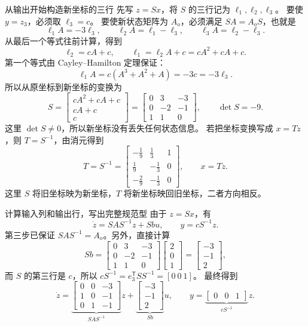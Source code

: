 \documentclass[11pt]{article}
\begin{document}
\begin{solution}
\begin{proofstep}{从输出开始构造新坐标的三行}
先写 $z=Sx$，将 $S$ 的三行记为 $\ell_1,\ell_2,\ell_3$。
要使 $y=z_3$，必须取 $\ell_3=c$。
要使新状态矩阵为 $A_o$，必须满足 $SA=A_oS$，也就是
\[
\ell_1A=-3\ell_3,\qquad
\ell_2A=\ell_1-\ell_3,\qquad
\ell_3A=\ell_2-\ell_3.
\]
从最后一个等式往前计算，得到
\[
\ell_2=cA+c,\qquad
\ell_1=\ell_2A+c=cA^2+cA+c.
\]
第一个等式由 Cayley--Hamilton 定理保证：
\[
\ell_1A=c(A^3+A^2+A)=-3c=-3\ell_3.
\]
所以从原坐标到新坐标的变换为
\[
S=\begin{bmatrix}cA^2+cA+c\\cA+c\\c\end{bmatrix}
=\begin{bmatrix}0&3&-3\\0&-2&-1\\1&1&0\end{bmatrix},\qquad \det S=-9.
\]
这里 $\det S\ne0$，所以新坐标没有丢失任何状态信息。
若把坐标变换写成 $x=Tz$，则 $T=S^{-1}$，由消元得到
\[
\boxed{T=S^{-1}=\begin{bmatrix}
-\tfrac19&\tfrac13&1\\
\tfrac19&-\tfrac13&0\\
-\tfrac29&-\tfrac13&0
\end{bmatrix},\qquad x=Tz.}
\]
这里 $S$ 将旧坐标映为新坐标，$T$ 将新坐标映回旧坐标，二者方向相反。
\end{proofstep}

\begin{proofstep}{计算输入列和输出行，写出完整规范型}
由于 $z=Sx$，有
\[
\dot z=SAS^{-1}z+Sbu,\qquad y=cS^{-1}z.
\]
第三步已保证 $SAS^{-1}=A_o$。另外，直接计算
\[
Sb=\begin{bmatrix}0&3&-3\\0&-2&-1\\1&1&0\end{bmatrix}
\begin{bmatrix}2\\0\\1\end{bmatrix}
=\begin{bmatrix}-3\\-1\\2\end{bmatrix},
\]
而 $S$ 的第三行是 $c$，所以 $cS^{-1}=e_3^{\mathsf T}SS^{-1}=[0\ 0\ 1]$。
最终得到
\[
\boxed{
\dot z=\underbrace{\begin{bmatrix}0&0&-3\\1&0&-1\\0&1&-1\end{bmatrix}}_{SAS^{-1}}z
+\underbrace{\begin{bmatrix}-3\\-1\\2\end{bmatrix}}_{Sb}u,
\qquad y=\underbrace{\begin{bmatrix}0&0&1\end{bmatrix}}_{cS^{-1}}z.}
\]
\end{proofstep}


\end{solution}
\end{document}
